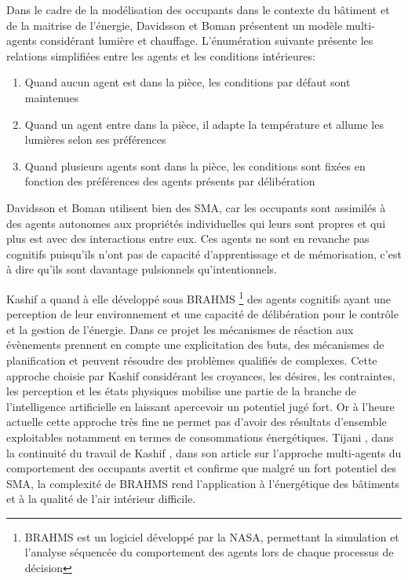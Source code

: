 Dans le cadre de la modélisation des occupants dans le contexte du bâtiment et de la maitrise de l'énergie, Davidsson et Boman \cite{Davidsson-05} présentent un modèle multi-agents considérant lumière et chauffage. L'énumération suivante présente les relations simplifiées entre les agents et les conditions intérieures:
\begin{enumerate}
\renewcommand{\arraystretch}{0}
\item Quand aucun agent est dans la pièce, les conditions par défaut sont maintenues
\item Quand un agent entre dans la pièce, il adapte la température et allume les lumières selon ses préférences
\item Quand plusieurs agents sont dans la pièce, les conditions sont fixées en fonction des préférences des agents présents par délibération
\end{enumerate}
Davidsson et Boman \cite{Davidsson-05} utilisent bien des SMA, car les occupants sont assimilés à des agents autonomes aux propriétés individuelles qui leurs sont propres et qui plus est avec des interactions entre eux. Ces agents ne sont en revanche pas cognitifs puisqu'ils n'ont pas de capacité d'apprentissage et de mémorisation, c'est à dire qu'ils sont davantage pulsionnels qu'intentionnels.

Kashif \cite{Kashif-11} a quand à elle développé sous BRAHMS \footnote{BRAHMS est un logiciel développé par la NASA, permettant la simulation et l'analyse séquencée du comportement des agents lors de chaque processus de décision} des agents cognitifs ayant une perception de leur environnement et une capacité de délibération pour le contrôle et la gestion de l'énergie. Dans ce projet les mécanismes de réaction aux évènements prennent en compte une explicitation des buts, des mécanismes de planification et peuvent résoudre des problèmes qualifiés de complexes. Cette approche choisie par Kashif considérant les croyances, les désires, les contraintes, les perception et les états physiques mobilise une partie de la branche de l'intelligence artificielle en laissant apercevoir un potentiel jugé fort. Or à l'heure actuelle cette approche très fine ne permet pas d'avoir des résultats d'ensemble exploitables notamment en termes de consommations énergétiques. Tijani \cite{Tijani-14}, dans la continuité du travail de Kashif \cite{Kashif-11}, dans son article sur l'approche multi-agents du comportement des occupants avertit et confirme que malgré un fort potentiel des SMA, la complexité de BRAHMS rend l'application à l'énergétique des bâtiments et à la qualité de l'air intérieur difficile.

